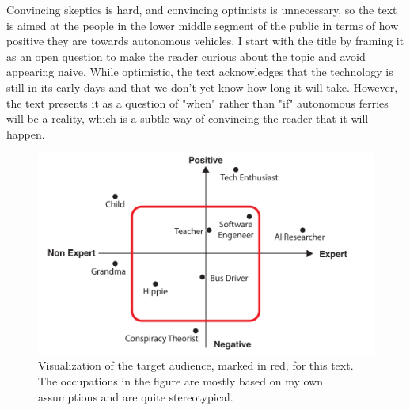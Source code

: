 \documentclass{iopconfser}
\begin{document}
Convincing skeptics is hard, and convincing optimists is unnecessary, so the text is aimed at the people in the lower middle segment of the public in terms of how positive they are towards autonomous vehicles.
I start with the title by framing it as an open question to make the reader curious about the topic and avoid appearing naive.
While optimistic, the text acknowledges that the technology is still in its early days and that we don't yet know how long it will take.
However, the text presents it as a question of "when" rather than "if" autonomous ferries will be a reality, which is a subtle way of convincing the reader that it will happen.

\begin{figure}[H]
    \centering
    \includegraphics[width=.8\textwidth]{figures/overview.pdf}
    \caption{Visualization of the target audience, marked in red, for this text.
        The occupations in the figure are mostly based on my own assumptions and are quite stereotypical.}
\end{figure}
\end{document}
